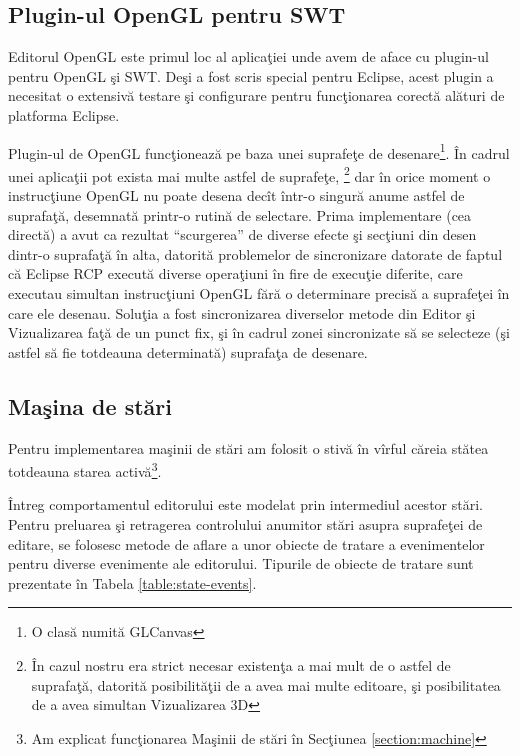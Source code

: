 \subsection{Plugin-ul OpenGL pentru SWT}
Editorul OpenGL este primul loc al aplicaţiei unde avem de aface cu plugin-ul
pentru OpenGL şi SWT. Deşi a fost scris special pentru Eclipse, acest plugin a
necesitat o extensivă testare şi configurare pentru funcţionarea corectă alături
de platforma Eclipse.

Plugin-ul de OpenGL funcţionează pe baza unei suprafeţe de desenare\footnote{O 
clasă numită GLCanvas}. În cadrul unei aplicaţii pot exista mai multe astfel de 
suprafeţe, \footnote{În cazul nostru era strict necesar existenţa a mai mult de 
o astfel de suprafaţă, datorită posibilităţii de a avea mai multe editoare, şi 
posibilitatea de a avea simultan Vizualizarea 3D} dar în orice moment o 
instrucţiune OpenGL nu poate desena decît într-o singură anume astfel de 
suprafaţă, desemnată printr-o rutină de selectare. Prima implementare (cea 
directă) a avut ca rezultat ``scurgerea'' de diverse efecte şi secţiuni din 
desen dintr-o suprafaţă în alta, datorită problemelor de sincronizare datorate 
de faptul că Eclipse RCP execută diverse operaţiuni în fire de execuţie 
diferite, care executau simultan instrucţiuni OpenGL fără o determinare precisă 
a suprafeţei în care ele desenau. Soluţia a fost sincronizarea diverselor 
metode din Editor şi Vizualizarea faţă de un punct fix, şi în cadrul zonei 
sincronizate să se selecteze (şi astfel să fie totdeauna determinată) suprafaţa 
de desenare.

\subsection{Maşina de stări}
Pentru implementarea maşinii de stări am folosit o stivă în vîrful căreia stătea
totdeauna starea activă\footnote{Am explicat funcţionarea Maşinii de stări în
Secţiunea \ref{section:machine}}.

Întreg comportamentul editorului este modelat prin intermediul acestor stări.
Pentru preluarea şi retragerea controlului anumitor stări asupra suprafeţei de
editare, se folosesc metode de aflare a unor obiecte de tratare a evenimentelor
pentru diverse evenimente ale editorului. Tipurile de obiecte de tratare sunt
prezentate în Tabela \ref{table:state-events}.

